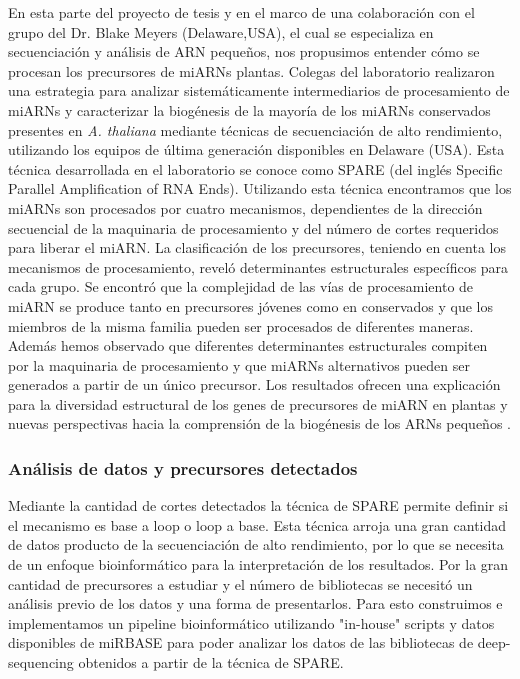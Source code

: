En esta parte del proyecto de tesis y en el marco de una colaboración con el grupo del Dr. Blake Meyers (Delaware,USA), el cual se especializa en secuenciación y análisis de ARN pequeños, nos propusimos entender cómo se procesan los precursores de miARNs plantas. 
Colegas del laboratorio realizaron una estrategia para analizar sistemáticamente intermediarios de procesamiento de miARNs y caracterizar la biogénesis de la mayoría de los miARNs conservados presentes en \textit{A. thaliana} mediante técnicas de secuenciación de alto rendimiento, utilizando los equipos de última generación disponibles en Delaware (USA).
Esta técnica desarrollada en el laboratorio se conoce como SPARE \citep{Schapire2013} (del inglés Specific Parallel Amplification of RNA Ends).
Utilizando esta técnica encontramos que los miARNs son procesados por cuatro mecanismos, dependientes de la dirección secuencial de la maquinaria de procesamiento y del número de cortes requeridos para liberar el miARN.
La clasificación de los precursores, teniendo en cuenta los mecanismos de procesamiento, reveló determinantes estructurales específicos para cada grupo.
Se encontró que la complejidad de las vías de procesamiento de miARN se produce tanto en precursores jóvenes como en conservados y que los miembros de la misma familia pueden ser procesados de diferentes maneras.
Además hemos observado que diferentes determinantes estructurales compiten por la maquinaria de procesamiento y que miARNs alternativos pueden ser generados a partir de un único precursor.
Los resultados ofrecen una explicación para la diversidad estructural de los genes de precursores de miARN en plantas y nuevas perspectivas hacia la comprensión de la biogénesis de los ARNs pequeños \citep{Bologna2013}.


\subsubsection{Análisis de datos y precursores detectados}
Mediante la cantidad de cortes detectados la técnica de SPARE permite definir si el mecanismo es base a loop o loop a base.
Esta técnica arroja una gran cantidad de datos producto de la secuenciación de alto rendimiento, por lo que se necesita de un enfoque bioinformático para la interpretación de los resultados.
Por la gran cantidad de precursores a estudiar y el número de bibliotecas se necesitó un análisis previo de los datos y una forma de presentarlos.
Para esto construimos e implementamos un pipeline bioinformático utilizando "in-house" scripts y datos disponibles de miRBASE para poder analizar los datos de las bibliotecas de deep-sequencing obtenidos a partir de la técnica de SPARE.

